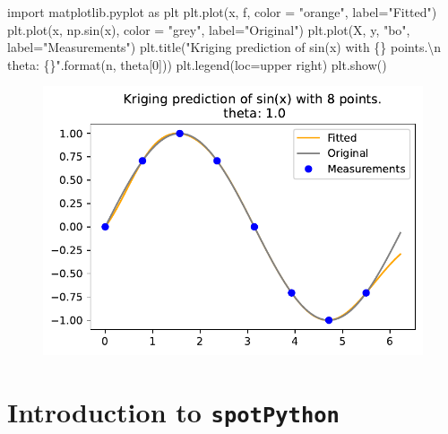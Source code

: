 \documentclass[
  letterpaper,
  DIV=11,
  numbers=noendperiod]{scrreprt}
\newenvironment{Shaded}{\begin{snugshade}}{\end{snugshade}}
\newcommand{\BuiltInTok}[1]{\textcolor[rgb]{0.00,0.23,0.31}{#1}}
\newcommand{\CharTok}[1]{\textcolor[rgb]{0.13,0.47,0.30}{#1}}
\newcommand{\DecValTok}[1]{\textcolor[rgb]{0.68,0.00,0.00}{#1}}
\newcommand{\ImportTok}[1]{\textcolor[rgb]{0.00,0.46,0.62}{#1}}
\newcommand{\NormalTok}[1]{\textcolor[rgb]{0.00,0.23,0.31}{#1}}
\newcommand{\OperatorTok}[1]{\textcolor[rgb]{0.37,0.37,0.37}{#1}}
\newcommand{\SpecialCharTok}[1]{\textcolor[rgb]{0.37,0.37,0.37}{#1}}
\newcommand{\StringTok}[1]{\textcolor[rgb]{0.13,0.47,0.30}{#1}}
\begin{document}
\begin{tcolorbox}
\begin{Shaded}
\begin{Highlighting}[]
\ImportTok{import}\NormalTok{ matplotlib.pyplot }\ImportTok{as}\NormalTok{ plt}
\NormalTok{plt.plot(x, f, color }\OperatorTok{=} \StringTok{"orange"}\NormalTok{, label}\OperatorTok{=}\StringTok{"Fitted"}\NormalTok{)}
\NormalTok{plt.plot(x, np.sin(x), color }\OperatorTok{=} \StringTok{"grey"}\NormalTok{, label}\OperatorTok{=}\StringTok{"Original"}\NormalTok{)}
\NormalTok{plt.plot(X, y, }\StringTok{"bo"}\NormalTok{, label}\OperatorTok{=}\StringTok{"Measurements"}\NormalTok{)}
\NormalTok{plt.title(}\StringTok{"Kriging prediction of sin(x) with }\SpecialCharTok{\{\}}\StringTok{ points.}\CharTok{\textbackslash{}n}\StringTok{ theta: }\SpecialCharTok{\{\}}\StringTok{"}\NormalTok{.}\BuiltInTok{format}\NormalTok{(n, theta[}\DecValTok{0}\NormalTok{]))}
\NormalTok{plt.legend(loc}\OperatorTok{=}\StringTok{\textquotesingle{}upper right\textquotesingle{}}\NormalTok{)}
\NormalTok{plt.show()}
\end{Highlighting}
\end{Shaded}

\begin{figure}[H]

{\centering \includegraphics{006_num_gp_files/figure-pdf/cell-57-output-1.pdf}

}

\end{figure}

\end{tcolorbox}

\hypertarget{sec-spot}{%
\chapter{\texorpdfstring{Introduction to
\texttt{spotPython}}{Introduction to spotPython}}\label{sec-spot}}
\end{document}

